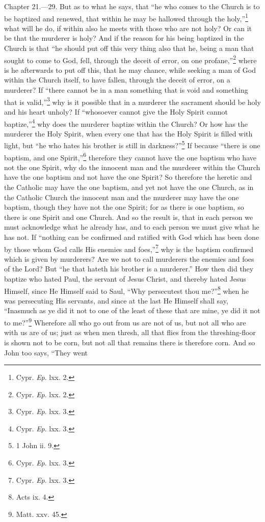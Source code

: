 Chapter 21.—29. But as to what he says, that ``he who comes to the Church is to be baptized and renewed, that within he may be hallowed through the holy,''\footnote{\par  Cypr. \emph{Ep}. lxx. 2.} what will he do, if within also he meets with those who are not holy? Or can it be that the murderer is holy? And if the reason for his being baptized in the Church is that ``he should put off this very thing also that he, being a man that sought to come to God, fell, through the deceit of error, on one profane,''\footnote{\par  Cypr. \emph{Ep}. lxx. 2.} where is he afterwards to put off this, that he may chance, while seeking a man of God within the Church itself, to have fallen, through the deceit of error, on a murderer? If ``there cannot be in a man something that is void and something that is valid,''\footnote{\par  Cypr. \emph{Ep}. lxx. 3.} why is it possible that in a murderer the sacrament should be holy and his heart unholy? If ``whosoever cannot give the Holy Spirit cannot baptize,''\footnote{\par  Cypr. \emph{Ep}. lxx. 3.} why does the murderer baptize within the Church? Or how has the murderer the Holy Spirit, when every one that has the Holy Spirit is filled with light, but ``he who hates his brother is still in darkness?''\footnote{\par  1 John ii. 9.} If because ``there is one baptism, and one Spirit,''\footnote{\par  Cypr. \emph{Ep}. lxx. 3.} therefore they cannot have the one baptism who have not the one Spirit, why do the innocent man and the murderer within the Church have the one baptism and not have the one Spirit? So therefore the heretic and the Catholic may have the one baptism, and yet not have the one Church, as in the Catholic Church the innocent man and the murderer may have the one baptism, though they have not the one Spirit; for as there is one baptism, so there is one Spirit and one Church. And so the result is, that in each person we must acknowledge what he already has, and to each person we must give what he has not. If ``nothing can be confirmed and ratified with God which has been done by those whom God calls His enemies and foes,''\footnote{\par  Cypr. \emph{Ep}. lxx. 3.} why is the baptism confirmed which is given by murderers? Are we not to call murderers the enemies and foes of the Lord? But ``he that hateth his brother is a murderer.'' How then did they baptize who hated Paul, the servant of Jesus Christ, and thereby hated Jesus Himself, since He Himself said to Saul, ``Why persecutest thou me?''\footnote{\par  Acts ix. 4.} when he was persecuting His servants, and since at the last He Himself shall say, ``Inasmuch as ye did it not to one of the least of these that are mine, ye did it not to me?''\footnote{\par  Matt. xxv. 45.} Wherefore all who go out from us are not of us, but not all who are with us are of us; just as when men thresh, all that flies from the threshing-floor is shown not to be corn, but not all that remains there is therefore corn. And so John too says, ``They went 